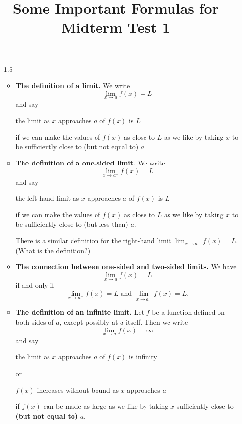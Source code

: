 \documentclass{article}
\title{Some Important Formulas for Midterm Test 1}
\author{\commonAuthor}
\date{\commonDateMTOne}
\newcommand{\ds}{\displaystyle}
\begin{document}
\maketitle

\begin{itemize}
\item[1.5]
  \begin{itemize}
  \item \textbf{The definition of a limit.} We write
    \begin{displaymath}
      \lim_{x\to a} f(x) = L
    \end{displaymath}
    and say
    \begin{center}
      the limit as $x$ approaches $a$ of $f(x)$ is $L$
    \end{center}
    if we can make the values of $f(x)$ as close to $L$ as we like
    by taking $x$ to be sufficiently close to (but not equal to) $a$.
  \item \textbf{The definition of a one-sided limit.} We write
    \begin{displaymath}
      \lim_{x\to a^-} f(x) = L
    \end{displaymath}
    and say
    \begin{center}
      the left-hand limit as $x$ approaches $a$ of $f(x)$ is $L$
    \end{center}
    if we can make the values of $f(x)$ as close to $L$ as we like by
    taking $x$ to be sufficiently close to (but less than) $a$.

    There is a similar definition for the right-hand limit
    $\ds\lim_{x\to a^+} f(x)=L$.  (What is the definition?)
  \item \textbf{The connection between one-sided and two-sided limits.}
    We have
    \begin{displaymath}
      \lim_{x\to a} f(x) = L
    \end{displaymath}
    if and only if
    \begin{displaymath}
      \lim_{x\to a^-} f(x) = L \mbox{ and } \lim_{x\to a^+} f(x) = L.
    \end{displaymath}
  \item \textbf{The definition of an infinite limit.}
    Let $f$ be a function defined on both sides of $a$, except possibly at
    $a$ itself.  Then we write
    \begin{displaymath}
      \lim_{x\to a} f(x) = \infty
    \end{displaymath}
    and say
    \begin{center}
      the limit as $x$ approaches $a$ of $f(x)$ is infinity
    \end{center}
    or
    \begin{center}
      $f(x)$ increases without bound as $x$ approaches $a$
    \end{center}
    if $f(x)$ can be made as large as we like by taking $x$ sufficiently close
    to \textbf{(but not equal to)} $a$.


\end{itemize}
\end{itemize}
\end{document}
